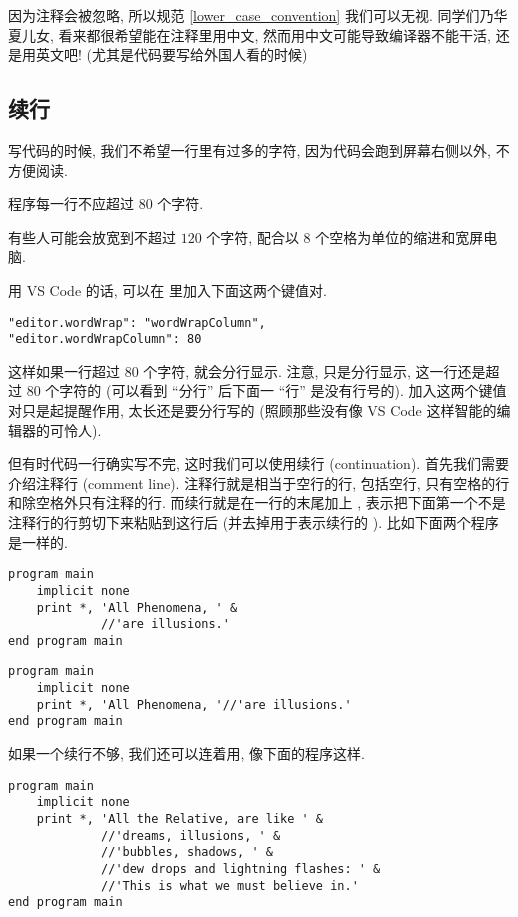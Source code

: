 因为注释会被忽略, 所以规范 \ref{lower_case_convention} 我们可以无视. 同学们乃华夏儿女, 看来都很希望能在注释里用中文, 然而用中文可能导致编译器不能干活, 还是用英文吧! (尤其是代码要写给外国人看的时候)

\subsection{续行}

写代码的时候, 我们不希望一行里有过多的字符, 因为代码会跑到屏幕右侧以外, 不方便阅读.
\begin{convention}
    程序每一行不应超过 $80$ 个字符.\label{fortran_no_more_than_80}
\end{convention}
有些人可能会放宽到不超过 $120$ 个字符, 配合以 8 个空格为单位的缩进和宽屏电脑.

用 VS Code 的话, 可以在  里加入下面这两个键值对.
\begin{verbatim}
"editor.wordWrap": "wordWrapColumn",
"editor.wordWrapColumn": 80
\end{verbatim}
这样如果一行超过 80 个字符, 就会分行显示. 注意, 只是分行显示, 这一行还是超过 80 个字符的 (可以看到 ``分行'' 后下面一 ``行'' 是没有行号的). 加入这两个键值对只是起提醒作用, 太长还是要分行写的 (照顾那些没有像 VS Code 这样智能的编辑器的可怜人).

但有时代码一行确实写不完, 这时我们可以使用续行 (continuation). 首先我们需要介绍注释行 (comment line). 注释行就是相当于空行的行, 包括空行, 只有空格的行和除空格外只有注释的行. 而续行就是在一行的末尾加上 \ttt{\&{}}, 表示把下面第一个不是注释行的行剪切下来粘贴到这行后 (并去掉用于表示续行的 \ttt{\&{}}). 比如下面两个程序是一样的.
\begin{lstlisting}
program main
    implicit none
    print *, 'All Phenomena, ' &
             //'are illusions.'
end program main
\end{lstlisting}
\begin{lstlisting}
program main
    implicit none
    print *, 'All Phenomena, '//'are illusions.'
end program main
\end{lstlisting}
如果一个续行不够, 我们还可以连着用, 像下面的程序这样.
\begin{lstlisting}
program main
    implicit none
    print *, 'All the Relative, are like ' &
             //'dreams, illusions, ' &
             //'bubbles, shadows, ' &
             //'dew drops and lightning flashes: ' &
             //'This is what we must believe in.'
end program main
\end{lstlisting}

